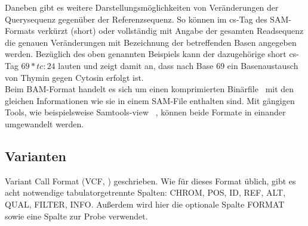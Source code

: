 Daneben gibt es weitere Darstellungsmöglichkeiten von Veränderungen der Querysequenz gegenüber der Referenzsequenz. So können im cs-Tag des SAM-Formats verkürzt (short) oder vollständig mit Angabe der gesamten Readsequenz die genauen Veränderungen mit Bezeichnung der betreffenden Basen angegeben werden. Bezüglich des oben genannten Beispiels kann der dazugehörige short cs-Tag $ 69*tc:24 $ lauten und zeigt damit an, dass nach Base $69$ ein Basenaustausch von Thymin gegen Cytosin erfolgt ist.\\

Beim BAM-Format handelt es sich um einen komprimierten Binärfile~\cite{sam_bam} mit den gleichen Informationen wie sie in einem SAM-File enthalten sind. Mit gängigen Tools, wie beispielsweise Samtools-view ~\cite{li_2009}, können beide Formate in einander umgewandelt werden.

\subsection{Varianten} \label{subsec:vcformat}
Variant Call Format (VCF, \cite{danecek_2011}) geschrieben. Wie für dieses Format üblich, gibt es acht notwendige tabulatorgetrennte Spalten: CHROM, POS, ID, REF, ALT, QUAL, FILTER, INFO. Außerdem wird hier die optionale Spalte FORMAT sowie eine Spalte zur Probe verwendet.